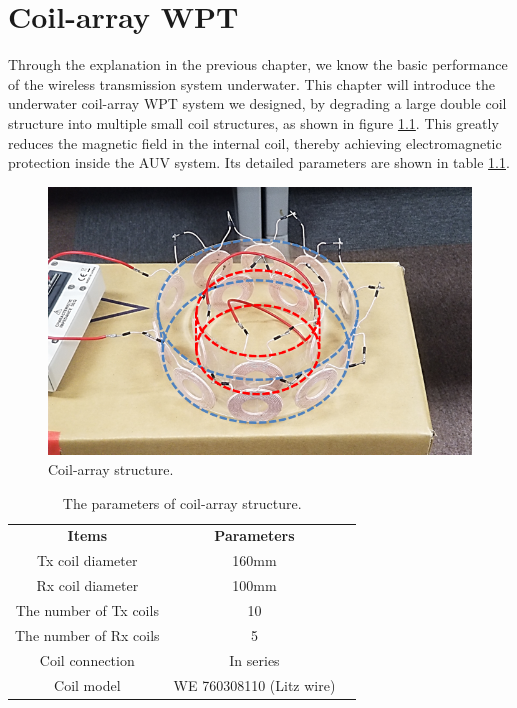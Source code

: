 \chapter{Coil-array WPT}
Through the explanation in the previous chapter, we know the basic performance of the wireless transmission system underwater. This chapter will introduce the underwater coil-array WPT system we designed, by degrading a large double coil structure into multiple small coil structures, as shown in figure \ref{fig:3_coil_array_structure}. This greatly reduces the magnetic field in the internal coil, thereby achieving electromagnetic protection inside the AUV system. Its detailed parameters are shown in table \ref{table: coil array parameters}.

\begin{figure}[!b]
    \centering
    \includegraphics[width=0.7\linewidth]{images/3_coil_array_structure.png}
    \caption{Coil-array structure.}
    \label{fig:3_coil_array_structure}
\end{figure}

\begin{table}[!t]
    \centering
    \caption{The parameters of coil-array structure.}
    \begin{tabular}{ c|cc }
        \thickhline
        \textbf{Items}         & \textbf{Parameters}      \\
        \thickhline
        Tx coil diameter       & 160mm                    \\ \hline
        Rx coil diameter       & 100mm                    \\ \hline
        The number of Tx coils & 10                       \\ \hline
        The number of Rx coils & 5                        \\ \hline
        Coil connection        & In series                \\ \hline
        Coil model             & WE 760308110 (Litz wire) \\ \hline
    \end{tabular}
    \label{table: coil array parameters}
\end{table}

